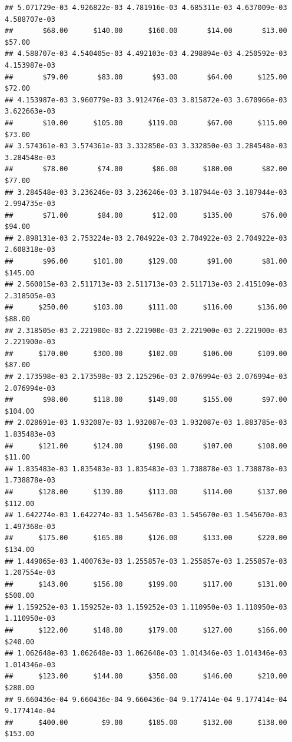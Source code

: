 \begin{verbatim}
## 5.071729e-03 4.926822e-03 4.781916e-03 4.685311e-03 4.637009e-03 4.588707e-03 
##       $68.00      $140.00      $160.00       $14.00       $13.00       $57.00 
## 4.588707e-03 4.540405e-03 4.492103e-03 4.298894e-03 4.250592e-03 4.153987e-03 
##       $79.00       $83.00       $93.00       $64.00      $125.00       $72.00 
## 4.153987e-03 3.960779e-03 3.912476e-03 3.815872e-03 3.670966e-03 3.622663e-03 
##       $10.00      $105.00      $119.00       $67.00      $115.00       $73.00 
## 3.574361e-03 3.574361e-03 3.332850e-03 3.332850e-03 3.284548e-03 3.284548e-03 
##       $78.00       $74.00       $86.00      $180.00       $82.00       $77.00 
## 3.284548e-03 3.236246e-03 3.236246e-03 3.187944e-03 3.187944e-03 2.994735e-03 
##       $71.00       $84.00       $12.00      $135.00       $76.00       $94.00 
## 2.898131e-03 2.753224e-03 2.704922e-03 2.704922e-03 2.704922e-03 2.608318e-03 
##       $96.00      $101.00      $129.00       $91.00       $81.00      $145.00 
## 2.560015e-03 2.511713e-03 2.511713e-03 2.511713e-03 2.415109e-03 2.318505e-03 
##      $250.00      $103.00      $111.00      $116.00      $136.00       $88.00 
## 2.318505e-03 2.221900e-03 2.221900e-03 2.221900e-03 2.221900e-03 2.221900e-03 
##      $170.00      $300.00      $102.00      $106.00      $109.00       $87.00 
## 2.173598e-03 2.173598e-03 2.125296e-03 2.076994e-03 2.076994e-03 2.076994e-03 
##       $98.00      $118.00      $149.00      $155.00       $97.00      $104.00 
## 2.028691e-03 1.932087e-03 1.932087e-03 1.932087e-03 1.883785e-03 1.835483e-03 
##      $121.00      $124.00      $190.00      $107.00      $108.00       $11.00 
## 1.835483e-03 1.835483e-03 1.835483e-03 1.738878e-03 1.738878e-03 1.738878e-03 
##      $128.00      $139.00      $113.00      $114.00      $137.00      $112.00 
## 1.642274e-03 1.642274e-03 1.545670e-03 1.545670e-03 1.545670e-03 1.497368e-03 
##      $175.00      $165.00      $126.00      $133.00      $220.00      $134.00 
## 1.449065e-03 1.400763e-03 1.255857e-03 1.255857e-03 1.255857e-03 1.207554e-03 
##      $143.00      $156.00      $199.00      $117.00      $131.00      $500.00 
## 1.159252e-03 1.159252e-03 1.159252e-03 1.110950e-03 1.110950e-03 1.110950e-03 
##      $122.00      $148.00      $179.00      $127.00      $166.00      $240.00 
## 1.062648e-03 1.062648e-03 1.062648e-03 1.014346e-03 1.014346e-03 1.014346e-03 
##      $123.00      $144.00      $350.00      $146.00      $210.00      $280.00 
## 9.660436e-04 9.660436e-04 9.660436e-04 9.177414e-04 9.177414e-04 9.177414e-04 
##      $400.00        $9.00      $185.00      $132.00      $138.00      $153.00 

\end{verbatim}

